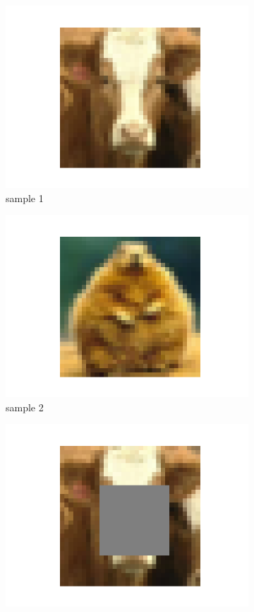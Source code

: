 \documentclass{article}
\begin{document}
\begin{figure}[h]
\begin{subfigure}{0.19\textwidth}
\includegraphics[width=\linewidth]{figure/baseline2.png}
\caption{sample 1}
\end{subfigure}
\begin{subfigure}{0.19\textwidth}
\includegraphics[width=\linewidth]{figure/baseline5.png}
\caption{sample 2}
\end{subfigure}
\begin{subfigure}{0.19\textwidth}
\includegraphics[width=\linewidth]{figure/cutout2.png}

\end{subfigure}
\end{figure}
\end{document}
